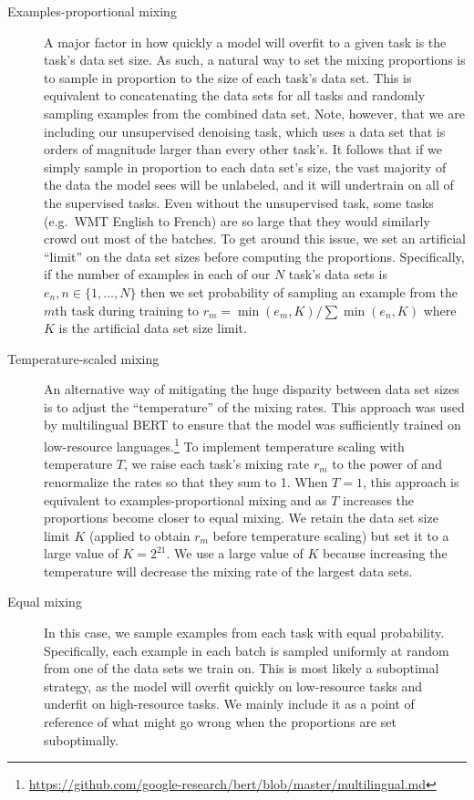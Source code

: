\documentclass[twoside,11pt]{article}
\begin{document}
\begin{description}
\item[Examples-proportional mixing] A major factor in how quickly a model will overfit to a given task is the task's data set size.
As such, a natural way to set the mixing proportions is to sample in proportion to the size of each task's data set.
This is equivalent to concatenating the data sets for all tasks and randomly sampling examples from the combined data set.
Note, however, that we are including our unsupervised denoising task, which uses a data set that is orders of magnitude larger than every other task's.
It follows that if we simply sample in proportion to each data set's size, the vast majority of the data the model sees will be unlabeled, and it will undertrain on all of the supervised tasks.
Even without the unsupervised task, some tasks (e.g.\ WMT English to French) are so large that they would similarly crowd out most of the batches.
To get around this issue, we set an artificial ``limit'' on the data set sizes before computing the proportions.
Specifically, if the number of examples in each of our $N$ task's data sets is $e_n, n \in \{1, \ldots, N\}$ then we set probability of sampling an example from the $m$th task during training to $r_m = \min(e_m, K)/\sum \min(e_n, K)$ where $K$ is the artificial data set size limit.

\item[Temperature-scaled mixing] An alternative way of mitigating the huge disparity between data set sizes is to adjust the ``temperature'' of the mixing rates.
This approach was used by multilingual BERT to ensure that the model was sufficiently trained on low-resource languages.\footnote{\url{https://github.com/google-research/bert/blob/master/multilingual.md}}
To implement temperature scaling with temperature $T$, we raise each task's mixing rate $r_m$ to the power of  and renormalize the rates so that they sum to 1.
When $T = 1$, this approach is equivalent to examples-proportional mixing and as $T$ increases the proportions become closer to equal mixing.
We retain the data set size limit $K$ (applied to obtain $r_m$ before temperature scaling) but set it to a large value of $K = 2^{21}$.
We use a large value of $K$ because increasing the temperature will decrease the mixing rate of the largest data sets.

\item[Equal mixing] In this case, we sample examples from each task with equal probability.
Specifically, each example in each batch is sampled uniformly at random from one of the data sets we train on.
This is most likely a suboptimal strategy, as the model will overfit quickly on low-resource tasks and underfit on high-resource tasks.
We mainly include it as a point of reference of what might go wrong when the proportions are set suboptimally.

\end{description}
\end{document}
